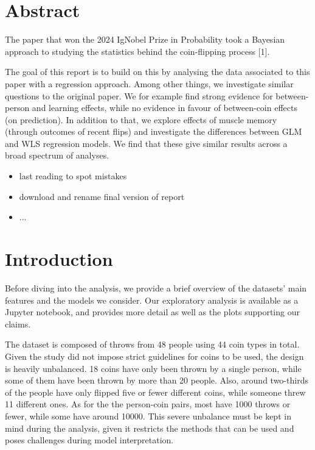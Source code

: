 \documentclass[a4paper, 12pt,oneside]{article}
\begin{document}
 
	 
	\clearpage
	\tableofcontents
	\thispagestyle{empty}
	\vspace{2cm}
	\section*{Abstract}
		The paper that won the 2024 IgNobel Prize in Probability took a Bayesian approach to studying the statistics behind the coin-flipping process [1]. 

		The goal of this report is to build on this by analysing the data associated to this paper with a regression approach. Among other things, we investigate similar questions to the original paper. We for example find strong evidence for between-person and learning effects, while no evidence in favour of between-coin effects (on prediction). In addition to that, we explore effects of muscle memory (through outcomes of recent flips) and investigate the differences between GLM and WLS regression models. We find that these give similar results across a broad spectrum of analyses. 
		\begin{itemize}
			\item last reading to spot mistakes
			\item download and rename final version of report 
			\item ...
		\end{itemize}
	\clearpage
	\setcounter{page}{1}
	\section{Introduction}
		Before diving into the analysis, we provide a brief overview of the datasets' main features and the models we consider. Our exploratory analysis is available as a Jupyter notebook, and provides more detail as well as the plots supporting our claims.

		The dataset is composed of throws from 48 people using 44 coin types in total. Given the study did not impose strict guidelines for coins to be used, the design is heavily unbalanced. 18 coins have only been thrown by a single person, while some of them have been thrown by more than 20 people. Also, around two-thirds of the people have only flipped five or fewer different coins, while someone threw 11 different ones. As for the the person-coin pairs, most have 1000 throws or fewer, while some have around 10000. This severe unbalance must be kept in mind during the analysis, given it restricts the methods that can be used and poses challenges during model interpretation. 
\end{document}
